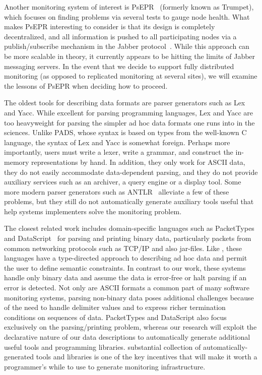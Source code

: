 \documentclass{sigplanconf}
\begin{document}
Another monitoring system of interest is PsEPR~\cite{psepr} (formerly
known as Trumpet), which focuses on finding problems via several tests
to gauge node health. What makes PsEPR interesting to consider is that
its design is completely decentralized, and all information is pushed
to all participating nodes via a publish/subscribe mechanism in the
Jabber protocol~\cite{jabber}. While this approach can be more
scalable in theory, it currently appears to be hitting the limits of
Jabber messaging servers. In the event that we decide to support
fully distributed monitoring (as opposed to replicated monitoring at
several sites), we will examine the lessons of PsEPR when deciding how
to proceed.

The oldest tools for describing data formats are parser generators such as
Lex and Yacc.  While excellent for parsing programming languages, Lex and Yacc
are too heavyweight for parsing the simpler ad hoc data formats one
runs into in the sciences.   
Unlike PADS, whose syntax is based on types from the well-known C language,
the syntax of Lex and Yacc is somewhat foreign.  Perhaps more importantly,
users must write a lexer, write a
grammar, and construct the in-memory representations by hand.  In
addition, they only work for ASCII data, they do not easily
accommodate data-dependent parsing, and they do not provide auxiliary
services such as an archiver, a query engine or a display tool.
Some more modern parser generators such as ANTLR~\cite{antlr} alleviate
a few of these problems, but they still do not automatically generate auxiliary tools
useful that help systems implementers solve the monitoring problem. 

The closest related work includes domain-specific
languages such as PacketTypes~\cite{sigcomm00} and DataScript~\cite{gpce02} 
for parsing and printing binary data, particularly packets
from common networking protocols such as \textsc{TCP/IP} and also
\java{} jar-files.  Like \pads{}, these languages have a type-directed
approach to describing ad hoc data and permit the user to define
semantic constraints.  In contrast to our work, these systems handle
only binary data and assume the data is error-free or halt parsing if
an error is detected.  Not only are ASCII formats a common part of
many software monitoring systems, parsing non-binary data poses additional
challenges because of the need to handle delimiter values and to
express richer termination conditions on sequences of data. 
PacketTypes and DataScript also focus exclusively on the 
parsing/printing problem,
whereas our research will exploit the declarative nature of our data
descriptions to automatically generate additional useful tools and
programming libraries.  \pads{} substantial 
collection of automatically-generated tools and libraries is 
one of the key incentives that will make it
worth a programmer's while to use \pads{} to generate monitoring infrastructure.
\end{document}
